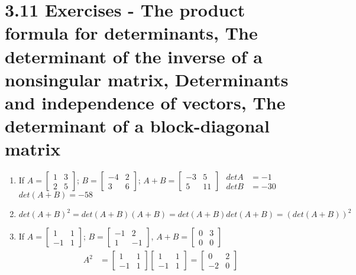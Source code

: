 \documentclass[twoside]{amsart}
\theoremstyle{plain}
\theoremstyle{definition}
\newcommand{\exercisehead}[1]
  {
   \noindent{\small\bf Exercise #1.}
   \smallskip}
\begin{document}
\section*{ 3.11 Exercises - The product formula for determinants, The determinant of the inverse of a nonsingular matrix, Determinants and independence of vectors, The determinant of a block-diagonal matrix }

\exercisehead{1}
\begin{enumerate}
\item If $A = \left[ \begin{matrix} 1 & 3 \\ 2 & 5 \end{matrix} \right]$; $B = \left[ \begin{matrix} -4 & 2 \\ 3 & 6 \end{matrix} \right]$; $A+B = \left[ \begin{matrix} -3 & 5 \\ 5 & 11 \end{matrix} \right]$  $\begin{aligned} det{A} & = -1 \\ det{B} & = -30 \end{aligned}$  $det{(A+B)} = -58$
\item $det{(A+B)^2} = det{(A+B)(A+B)} = det{(A+B)} det{(A+B)} = (det{(A+B)})^2$
\item If $A =\left[ \begin{matrix} 1 & 1 \\ -1 & 1 \end{matrix} \right]$; $B = \left[ \begin{matrix} -1 & 2 \\ 1 & -1 \end{matrix} \right]$, $A+B = \left[ \begin{matrix} 0 & 3 \\ 0 & 0 \end{matrix} \right]$  
\[
\begin{gathered}
  \begin{aligned}
    A^2 & = \left[ \begin{matrix} 1 & 1 \\ -1 & 1 \end{matrix} \right]\left[ \begin{matrix} 1 & 1 \\ -1 & 1 \end{matrix} \right] = \left[ \begin{matrix} 0 & 2 \\ -2 & 0 \end{matrix} \right] \\

\end{aligned}
\end{gathered}\]
\end{enumerate}
\end{document}
